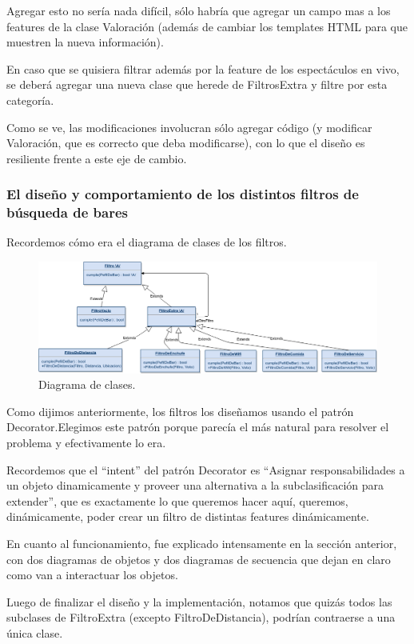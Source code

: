 Agregar esto no sería nada difícil, sólo habría que agregar un campo mas a los features de la clase Valoración (además de cambiar los templates HTML para que muestren la nueva información).

En caso que se quisiera filtrar además por la feature de los espectáculos en vivo, se deberá agregar una nueva clase que herede de FiltrosExtra y filtre por esta categoría.

Como se ve, las modificaciones involucran sólo agregar código (y modificar Valoración, que es correcto que deba modificarse), con lo que el diseño es resiliente frente a este eje de cambio.

\subsubsection{El diseño y comportamiento de los distintos filtros de búsqueda de bares}

Recordemos cómo era el diagrama de clases de los filtros.

\begin{figure}[H]
  \centering
  \includegraphics[width=\textwidth]{diagramas/filtro_clases.png}
  \caption{\normalfont Diagrama de clases.}
\end{figure}


Como dijimos anteriormente, los filtros los diseñamos usando el patrón Decorator.Elegimos este patrón porque parecía el más natural para resolver el problema y efectivamente lo era.

Recordemos que el ``intent'' del patrón Decorator es ``Asignar responsabilidades a un objeto dinamicamente y proveer una alternativa a la subclasificación para extender'', que es exactamente lo que queremos hacer aquí, queremos, dinámicamente, poder crear un filtro de distintas features dinámicamente.

En cuanto al funcionamiento, fue explicado intensamente en la sección anterior, con dos diagramas de objetos y dos diagramas de secuencia que dejan en claro como van a interactuar los objetos.

Luego de finalizar el diseño y la implementación, notamos que quizás todos las subclases de FiltroExtra (excepto FiltroDeDistancia), podrían contraerse a una única clase. 

